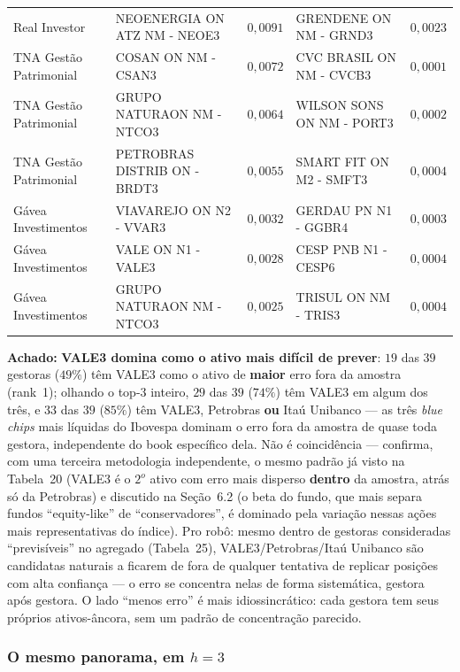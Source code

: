 \documentclass[11pt,a4paper]{article}
\newcommand{\aha}[1]{\par\vspace{4pt}\noindent\textbf{\color{vermelho}Achado:} #1\par\vspace{2pt}}
\begin{document}
\begin{center}
\begin{longtable}{@{}lp{3.9cm}rp{3.9cm}r@{}}
Real Investor & NEOENERGIA ON ATZ NM - NEOE3 & $0{,}0091$ & GRENDENE ON NM - GRND3 & $0{,}0023$ \\
TNA Gestão Patrimonial & COSAN ON NM - CSAN3 & $0{,}0072$ & CVC BRASIL ON NM - CVCB3 & $0{,}0001$ \\
TNA Gestão Patrimonial & GRUPO NATURAON NM - NTCO3 & $0{,}0064$ & WILSON SONS ON NM - PORT3 & $0{,}0002$ \\
TNA Gestão Patrimonial & PETROBRAS DISTRIB ON - BRDT3 & $0{,}0055$ & SMART FIT ON M2 - SMFT3 & $0{,}0004$ \\
Gávea Investimentos & VIAVAREJO ON N2 - VVAR3 & $0{,}0032$ & GERDAU PN N1 - GGBR4 & $0{,}0003$ \\
Gávea Investimentos & VALE ON N1 - VALE3 & $0{,}0028$ & CESP PNB N1 - CESP6 & $0{,}0004$ \\
Gávea Investimentos & GRUPO NATURAON NM - NTCO3 & $0{,}0025$ & TRISUL ON NM - TRIS3 & $0{,}0004$ \\
\end{longtable}
\end{center}

\aha{\textbf{VALE3 domina como o ativo mais difícil de prever}: $19$ das $39$ gestoras
($49\%$) têm VALE3 como o ativo de \textbf{maior} erro fora da amostra (rank~1); olhando o
top-3 inteiro, $29$ das $39$ ($74\%$) têm VALE3 em algum dos três, e $33$ das $39$ ($85\%$) têm
VALE3, Petrobras \textbf{ou} Itaú Unibanco --- as três \emph{blue chips} mais líquidas do
Ibovespa dominam o erro fora da amostra de quase toda gestora, independente do book específico
dela. Não é coincidência --- confirma, com uma terceira metodologia independente, o mesmo padrão
já visto na Tabela~20 (VALE3 é o $2^o$ ativo com erro mais disperso \textbf{dentro} da amostra,
atrás só da Petrobras) e discutido na Seção~6.2 (o beta do fundo, que mais separa fundos
``equity-like'' de ``conservadores'', é dominado pela variação nessas ações mais representativas
do índice). Pro robô: mesmo dentro de gestoras consideradas ``previsíveis'' no agregado
(Tabela~25), VALE3/Petrobras/Itaú Unibanco são candidatas naturais a ficarem de fora de qualquer
tentativa de replicar posições com alta confiança --- o erro se concentra nelas de forma
sistemática, gestora após gestora. O lado ``menos erro'' é mais idiossincrático: cada gestora tem
seus próprios ativos-âncora, sem um padrão de concentração parecido.}

\subsubsection*{O mesmo panorama, em $h{=}3$}
\end{document}
